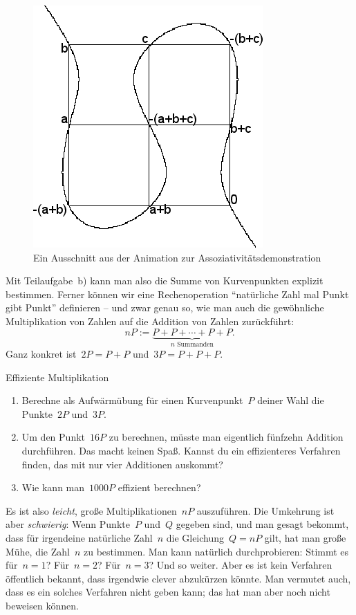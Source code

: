 \documentclass{zirkelblatt}
\begin{document}
\begin{figure}[t]
  \centering
  \includegraphics[scale=0.4]{elliptic-curve-associativity}
  \caption{Ein Ausschnitt aus der Animation zur Assoziativitätsdemonstration}
\end{figure}

Mit Teilaufgabe~b) kann man also die Summe von Kurvenpunkten explizit
bestimmen. Ferner können wir eine Rechenoperation "`natürliche Zahl mal Punkt
gibt Punkt"' definieren -- und zwar genau so, wie man auch die gewöhnliche
Multiplikation von Zahlen auf die Addition von Zahlen zurückführt:
\[ n P := \underbrace{P + P + \cdots + P + P}_{\text{$n$ Summanden}}. \]
Ganz konkret ist~$2 P = P + P$ und~$3 P = P + P + P$.

\begin{aufgabeShaded}{Effiziente Multiplikation}
\begin{enumerate}
\item Berechne als Aufwärmübung für einen Kurvenpunkt~$P$ deiner Wahl die
Punkte~$2P$ und~$3P$.
\item Um den Punkt~$16P$ zu berechnen, müsste man eigentlich fünfzehn Addition
durchführen. Das macht keinen Spaß. Kannst du ein effizienteres Verfahren
finden, das mit nur vier Additionen auskommt?
\item Wie kann man~$1000P$ effizient berechnen?
\end{enumerate}
\end{aufgabeShaded}

Es ist also \emph{leicht}, große Multiplikationen~$nP$ auszuführen. Die
Umkehrung ist aber \emph{schwierig}: Wenn Punkte~$P$ und~$Q$ gegeben sind, und
man gesagt bekommt, dass für irgendeine natürliche Zahl~$n$ die Gleichung~$Q =
nP$ gilt, hat man große Mühe, die Zahl~$n$ zu bestimmen. Man kann natürlich
durchprobieren: Stimmt es für~$n = 1$? Für~$n = 2$? Für~$n = 3$? Und so weiter.
Aber es ist kein Verfahren öffentlich bekannt, dass irgendwie clever abzukürzen
könnte. Man vermutet auch, dass es ein solches Verfahren nicht geben kann; das
hat man aber noch nicht beweisen können.
\end{document}
